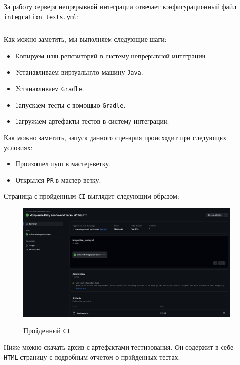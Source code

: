 \documentclass[a4paper, 14pt]{article}
\begin{document}
За работу сервера непрерывной интеграции отвечает конфигурационный файл \texttt{integration\_tests.yml}:
\small
\inputminted[frame=single]{yaml}{./code/1.yml}
\large

Как можно заметить, мы выполняем следующие шаги:

\begin{itemize}
    \item Копируем наш репозиторий в систему непрерывной интеграции.
    \item Устанавливаем виртуальную машину \texttt{Java}.
    \item Устанавливаем \texttt{Gradle}.
    \item Запускаем тесты с помощью \texttt{Gradle}.
    \item Загружаем артефакты тестов в систему интеграции.
\end{itemize}

Как можно заметить, запуск данного сценария происходит при следующих условиях:

\begin{itemize}
    \item Произошел пуш в мастер-ветку.
    \item Открылся \texttt{PR} в мастер-ветку.
\end{itemize}

Страница с пройденным \texttt{CI} выглядит следующим образом:

\begin{figure}[H]
    \centering
    \includegraphics[width=17cm]{resources/2.png}\\
    \caption{Пройденный \texttt{CI}}
\end{figure}

Ниже можно скачать архив с артефактами тестирования. Он содержит в себе \texttt{HTML}-страницу с подробным отчетом о пройденных тестах.
\end{document}
